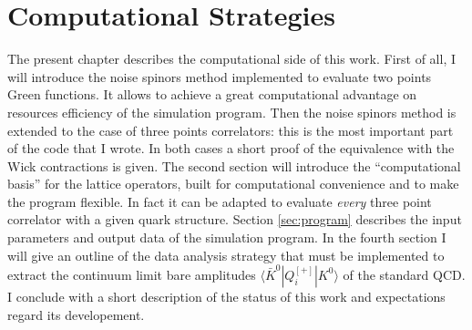 \documentclass[english, LaM, oneside, noexaminfo]{sapthesis}
\newcommand{\la}{\langle}
\newcommand{\ra}{\rangle}
\begin{document}
\chapter{Computational Strategies}
\lettrine[lines=2, findent=3pt, nindent=0pt]{T}{}he present chapter describes the computational side of this work.
First of all, I will introduce the noise spinors method implemented to evaluate two points Green functions.
It allows to achieve a great computational advantage on resources efficiency of the simulation program.
Then the noise spinors method is extended to the case of three points correlators: this is the most important part of the code that I wrote.
In both cases a short proof of the equivalence with the Wick contractions is given.
The second section will introduce the ``computational basis'' for the lattice operators, built for computational convenience and to make the program flexible.
In fact it can be adapted to evaluate {\it every} three point correlator with a given quark structure.
Section \ref{sec:program} describes the input parameters and output data of the simulation program.
In the fourth section I will give an outline of the data analysis strategy that must be implemented to extract the continuum limit bare amplitudes $\la \bar K^0 | Q_i^{[+]} | K^0 \ra $ of the standard QCD.
I conclude with a short description of the status of this work and expectations regard its developement.
\end{document}
